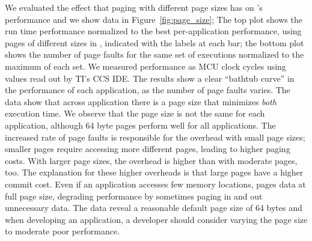 We evaluated the effect that paging with different page sizes has on \sys's performance and we show data in Figure~\ref{fig:page_size}; The top plot shows the run time performance normalized to the best per-application performance, using pages of different sizes in \sys, indicated with the labels at each bar; the bottom plot shows the number of page faults for the same set of executions normalized to the maximum of each set. We measured performance as MCU clock cycles using values read out by TI's CCS IDE. The results show a clear ``bathtub curve'' in the performance of each application, as the number of page faults varies. The data show that across application there is a page size that minimizes \emph{both} execution time. We observe that the page size is not the same for each application, although 64 byte pages perform well for all applications. The increased rate of page faults is responsible for the overhead with small page sizes; smaller pages require accessing more different pages, leading to higher paging costs. With larger page sizes, the overhead is higher than with moderate pages, too. The explanation for these higher overheads is that large pages have a higher commit cost. Even if an application accesses few memory locations, \sys pages data at full page size, degrading performance by sometimes paging in and out unnecessary data. The data reveal a reasonable default page size of 64 bytes and when developing an application, a developer should consider varying the page size to moderate poor performance.

